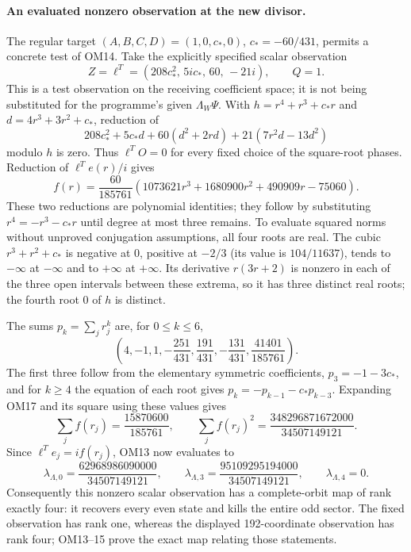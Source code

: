 \documentclass[11pt]{article}
\begin{document}
\paragraph{An evaluated nonzero observation at the new divisor.}
The regular target $(A,B,C,D)=(1,0,c_*,0)$, $c_*=-60/431$, permits
a concrete test of OM14.  Take the explicitly specified scalar
observation
\[
Z=\ell^T=(208c_*^2,\,5ic_*,\,60,\,-21i),\qquad Q=1.
\tag{OM16}
\]
This is a test observation on the receiving coefficient space;
it is not being substituted for the programme's given $\Lambda_W\Psi$.
With $h=r^4+r^3+c_*r$ and $d=4r^3+3r^2+c_*$, reduction of
\[
208c_*^2+5c_*d+60(d^2+2rd)+21(7r^2d-13d^2)
\]
modulo $h$ is zero.  Thus $\ell^TO=0$ for every fixed choice of
the square-root phases.  Reduction of $\ell^T e(r)/i$ gives
\[
f(r)=\frac{60}{185761}
 (1073621r^3+1680900r^2+490909r-75060).
\tag{OM17}
\]
These two reductions are polynomial identities; they follow by
substituting $r^4=-r^3-c_*r$ until degree at most three remains.
To evaluate squared norms without unproved conjugation assumptions,
all four roots are real.  The cubic $r^3+r^2+c_*$ is negative at
$0$, positive at $-2/3$ (its value is $104/11637$), tends to
$-\infty$ at $-\infty$ and to $+\infty$ at $+\infty$.
Its derivative $r(3r+2)$ is nonzero in each of the three open
intervals between these extrema, so it has three distinct real
roots; the fourth root $0$ of $h$ is distinct.

The sums $p_k=\sum_jr_j^k$ are, for $0\le k\le6$,
\[
\left(4,-1,1,-\frac{251}{431},\frac{191}{431},
             -\frac{131}{431},\frac{41401}{185761}\right).
\tag{OM18}
\]
The first three follow from the elementary symmetric coefficients,
$p_3=-1-3c_*$, and for $k\ge4$ the equation of each root gives
$p_k=-p_{k-1}-c_*p_{k-3}$.  Expanding OM17 and its square using
these values gives
\[
\sum_jf(r_j)=\frac{15870600}{185761},\qquad
\sum_jf(r_j)^2=\frac{348296871672000}{34507149121}.
\tag{OM19}
\]
Since $\ell^Te_j=if(r_j)$, OM13 now evaluates to
\[
\lambda_{\Lambda,0}=\frac{62968986090000}{34507149121},
\qquad
\lambda_{\Lambda,3}=\frac{95109295194000}{34507149121},
\qquad
\lambda_{\Lambda,4}=0.
\tag{OM20}
\]
Consequently this nonzero scalar observation has a complete-orbit
map of rank exactly four: it recovers every even state and kills
the entire odd sector.  The fixed observation has rank one, whereas
the displayed 192-coordinate observation has rank four; OM13--15
prove the exact map relating those statements.
\end{document}
